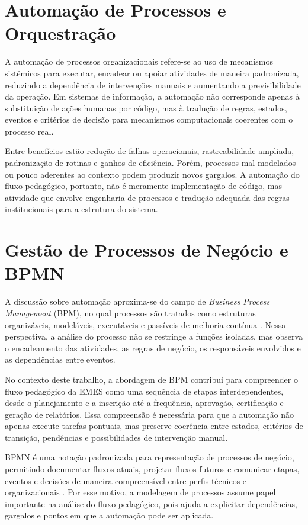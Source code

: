 \section{Automação de Processos e Orquestração}
\label{sec:revbib:automação}

A automação de processos organizacionais refere-se ao uso de mecanismos
sistêmicos para executar, encadear ou apoiar atividades de maneira padronizada,
reduzindo a dependência de intervenções manuais e aumentando a previsibilidade
da operação. Em sistemas de informação, a automação não corresponde apenas à
substituição de ações humanas por código, mas à tradução de regras, estados,
eventos e critérios de decisão para mecanismos computacionais coerentes com o
processo real.

Entre benefícios estão redução de falhas operacionais, rastreabilidade ampliada,
padronização de rotinas e ganhos de eficiência. Porém, processos mal modelados
ou pouco aderentes ao contexto podem produzir novos gargalos. A automação do
fluxo pedagógico, portanto, não é meramente implementação de código, mas
atividade que envolve engenharia de processos e tradução adequada das regras
institucionais para a estrutura do sistema.

\section{Gestão de Processos de Negócio e BPMN}
\label{sec:revbib:bpm-bpmn}

A discussão sobre automação aproxima-se do campo de \textit{Business Process
Management} (BPM), no qual processos são tratados como estruturas
organizáveis, modeláveis, executáveis e passíveis de melhoria contínua
\cite{Weske2024,DumasEtAl2018}. Nessa perspectiva, a análise do processo não se
restringe a funções isoladas, mas observa o encadeamento das atividades, as
regras de negócio, os responsáveis envolvidos e as dependências entre eventos.

No contexto deste trabalho, a abordagem de BPM contribui para compreender o
fluxo pedagógico da EMES como uma sequência de etapas interdependentes, desde o
planejamento e a inscrição até a frequência, aprovação, certificação e geração
de relatórios. Essa compreensão é necessária para que a automação não apenas
execute tarefas pontuais, mas preserve coerência entre estados, critérios de
transição, pendências e possibilidades de intervenção manual.

BPMN é uma notação padronizada para representação de processos de negócio,
permitindo documentar fluxos atuais, projetar fluxos futuros e comunicar etapas,
eventos e decisões de maneira compreensível entre perfis técnicos e
organizacionais \cite{OMG2014}. Por esse motivo, a modelagem de processos
assume papel importante na análise do fluxo pedagógico, pois ajuda a explicitar
dependências, gargalos e pontos em que a automação pode ser aplicada.

